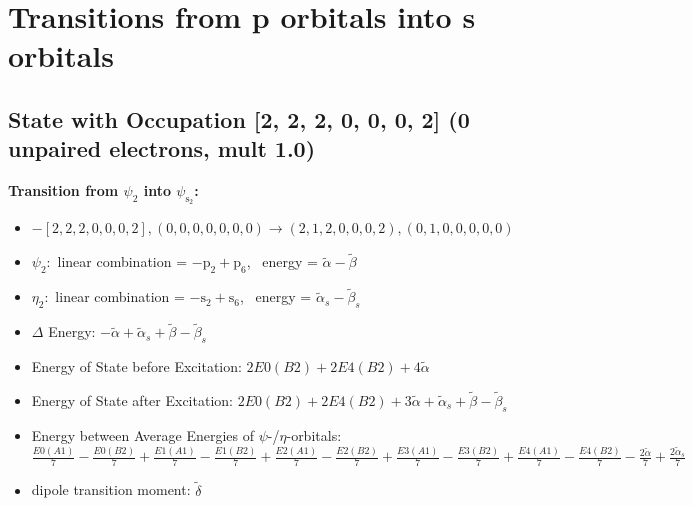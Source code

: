 \documentclass[12pt,a4paper]{article}
\begin{document}
\newpage \section*{Transitions from p orbitals into s orbitals}\subsection*{State with Occupation [2, 2, 2, 0, 0, 0, 2] (0 unpaired electrons, mult 1.0)}
        \noindent\textbf{Transition from $\psi_{2}$ into $\psi_{\text{s}_{2}}$:}
        \begin{itemize}
            \item $- [2, 2, 2, 0, 0, 0, 2], (0, 0, 0, 0, 0, 0, 0) \rightarrow (2, 1, 2, 0, 0, 0, 2), (0, 1, 0, 0, 0, 0, 0)$
        
            \item $\psi_{2}:$ linear combination = $- \text{p}_{2} + \text{p}_{6}$, \
            energy = $\tilde{\alpha} - \tilde{\beta}$
            
            \item $\eta_{2}:$ linear combination = $- \text{s}_{2} + \text{s}_{6}$, \
            energy = $\tilde{\alpha}_{s} - \tilde{\beta}_{s}$
            
                \item $\Delta$ Energy: $- \tilde{\alpha} + \tilde{\alpha}_{s} + \tilde{\beta} - \tilde{\beta}_{s}$
                \item Energy of State before Excitation: $2 E0(B2) + 2 E4(B2) + 4 \tilde{\alpha}$
                \item Energy of State after Excitation: $2 E0(B2) + 2 E4(B2) + 3 \tilde{\alpha} + \tilde{\alpha}_{s} + \tilde{\beta} - \tilde{\beta}_{s}$
                \item Energy between Average Energies of $\psi$-/$\eta$-orbitals: $\frac{E0(A1)}{7} - \frac{E0(B2)}{7} + \frac{E1(A1)}{7} - \frac{E1(B2)}{7} + \frac{E2(A1)}{7} - \frac{E2(B2)}{7} + \frac{E3(A1)}{7} - \frac{E3(B2)}{7} + \frac{E4(A1)}{7} - \frac{E4(B2)}{7} - \frac{2 \tilde{\alpha}}{7} + \frac{2 \tilde{\alpha}_{s}}{7}$
            
            \item dipole transition moment: $\tilde{\delta}$
        
        \end{itemize}
        
\end{document}
